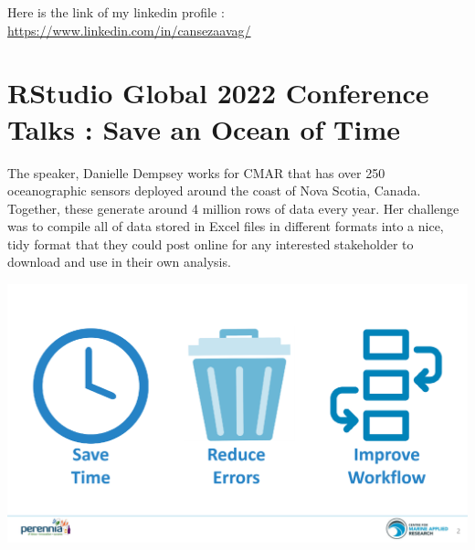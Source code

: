 \documentclass[
  letterpaper,
  DIV=11,
  numbers=noendperiod]{scrreprt}
\begin{document}
Here is the link of my linkedin profile :
\url{https://www.linkedin.com/in/cansezaavag/}


\hypertarget{rstudio-global-2022-conference-talks-save-an-ocean-of-time}{%
\chapter{RStudio Global 2022 Conference Talks : Save an Ocean of
Time}\label{rstudio-global-2022-conference-talks-save-an-ocean-of-time}}

The speaker, Danielle Dempsey works for CMAR that has over 250
oceanographic sensors deployed around the coast of Nova Scotia, Canada.
Together, these generate around 4 million rows of data every year. Her
challenge was to compile all of data stored in Excel files in different
formats into a nice, tidy format that they could post online for any
interested stakeholder to download and use in their own analysis.

\includegraphics{./writingcode.png}
\end{document}
